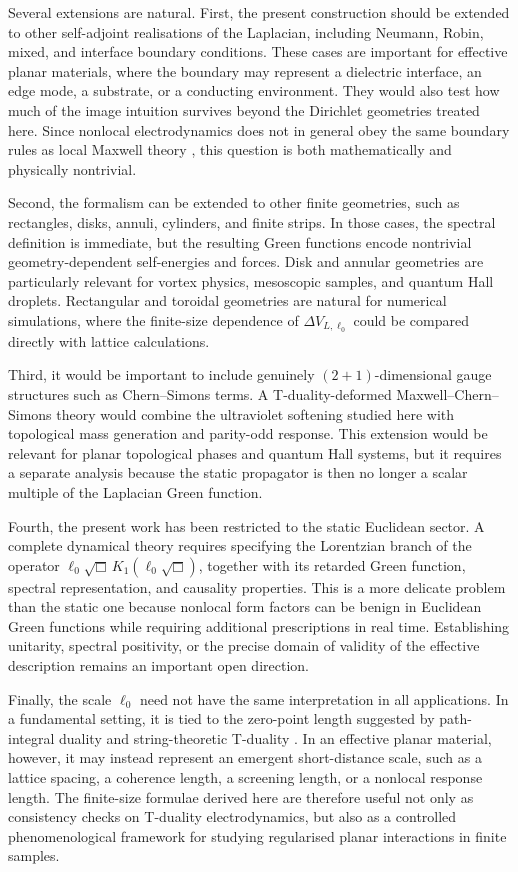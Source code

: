 \documentclass[openacc]{rsproca_new}%
\begin{document}
Several extensions are natural. First, the present construction should be extended to other self-adjoint realisations of the Laplacian, including Neumann, Robin, mixed, and interface boundary conditions. These cases are important for effective planar materials, where the boundary may represent a dielectric interface, an edge mode, a substrate, or a conducting environment. They would also test how much of the image intuition survives beyond the Dirichlet geometries treated here. Since nonlocal electrodynamics does not in general obey the same boundary rules as local Maxwell theory \cite{BorgesBufalo2025}, this question is both mathematically and physically nontrivial.

Second, the formalism can be extended to other finite geometries, such as rectangles, disks, annuli, cylinders, and finite strips. In those cases, the spectral definition is immediate, but the resulting Green functions encode nontrivial geometry-dependent self-energies and forces. Disk and annular geometries are particularly relevant for vortex physics, mesoscopic samples, and quantum Hall droplets. Rectangular and toroidal geometries are natural for numerical simulations, where the finite-size dependence of $\Delta V_{L,\ell_0}$ could be compared directly with lattice calculations.

Third, it would be important to include genuinely $(2+1)$-dimensional gauge structures such as Chern--Simons terms. A T-duality-deformed Maxwell--Chern--Simons theory would combine the ultraviolet softening studied here with topological mass generation and parity-odd response. This extension would be relevant for planar topological phases and quantum Hall systems, but it requires a separate analysis because the static propagator is then no longer a scalar multiple of the Laplacian Green function.

Fourth, the present work has been restricted to the static Euclidean sector. A complete dynamical theory requires specifying the Lorentzian branch of the operator $\ell_0\sqrt{\Box}\, K_1(\ell_0\sqrt{\Box})$, together with its retarded Green function, spectral representation, and causality properties. This is a more delicate problem than the static one because nonlocal form factors can be benign in Euclidean Green functions while requiring additional prescriptions in real time. Establishing unitarity, spectral positivity, or the precise domain of validity of the effective description remains an important open direction.

Finally, the scale $\ell_0$ need not have the same interpretation in all applications. In a fundamental setting, it is tied to the zero-point length suggested by path-integral duality and string-theoretic T-duality \cite{Padmanabhan1997, SmailagicSpallucciPadmanabhan2003, FontaniniSpallucciPadmanabhan2006}. In an effective planar material, however, it may instead represent an emergent short-distance scale, such as a lattice spacing, a coherence length, a screening length, or a nonlocal response length. The finite-size formulae derived here are therefore useful not only as consistency checks on T-duality electrodynamics, but also as a controlled phenomenological framework for studying regularised planar interactions in finite samples.
\end{document}
